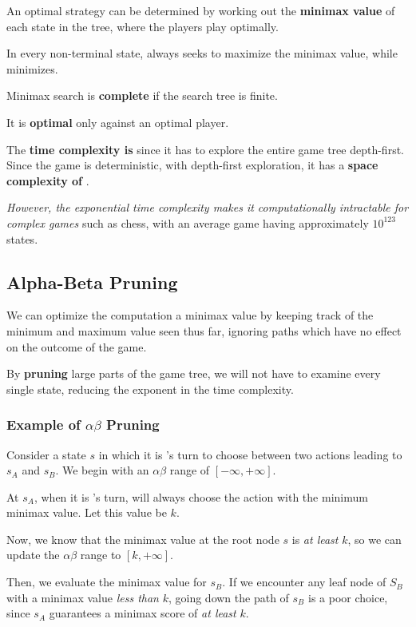         An optimal strategy can be determined by working out the \textbf{minimax value} of each state in the tree, where the players play optimally.

        In every non-terminal state,  always seeks to maximize the minimax value, while  minimizes.

        Minimax search is \textbf{complete} if the search tree is finite.

        It is \textbf{optimal} only against an optimal player.

        The \textbf{time complexity is}  since it has to explore the entire game tree depth-first. Since the game is deterministic, with depth-first exploration, it has a \textbf{space complexity of} .

        \emph{However, the exponential time complexity makes it computationally intractable for complex games} such as chess, with an average game having approximately $10^{123}$ states.

    \subsection{Alpha-Beta Pruning}
        We can optimize the computation a minimax value by keeping track of the minimum and maximum value seen thus far, ignoring paths which have no effect on the outcome of the game.

        By \textbf{pruning} large parts of the game tree, we will not have to examine every single state, reducing the exponent in the time complexity.

        \subsubsection{Example of $\alpha$\textendash$\beta$ Pruning}
            Consider a state $s$ in which it is 's turn to choose between two actions leading to $s_A$ and $s_B$. We begin with an $\alpha$\textendash$\beta$ range of $[-\infty, +\infty]$.

            At $s_A$, when it is 's turn,  will always choose the action with the minimum minimax value. Let this value be $k$.

            Now, we know that the minimax value at the root node $s$ is \emph{at least} $k$, so we can update the $\alpha$\textendash$\beta$ range to $[k, +\infty]$.

            Then, we evaluate the minimax value for $s_B$. If we encounter any leaf node of $S_B$ with a minimax value \emph{less than} $k$, going down the path of $s_B$ is a poor choice, since $s_A$ guarantees a minimax score of \emph{at least} $k$.

